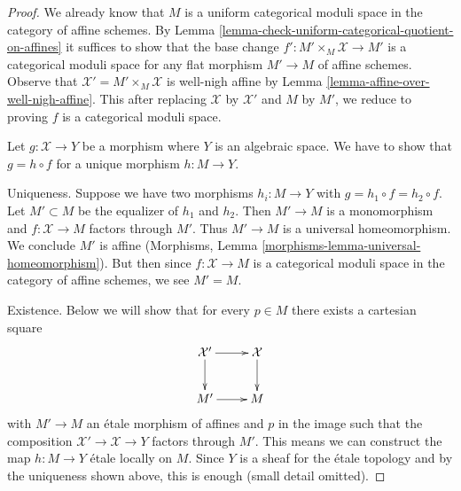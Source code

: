 \documentclass[10pt,a4paper]{amsart}
\theoremstyle{plain}
\theoremstyle{definition}
\theoremstyle{remark}
\numberwithin{equation}{subsection}
\begin{document}
\begin{proof}
We already know that $M$ is a uniform categorical moduli space
in the category of affine schemes. By
Lemma \ref{lemma-check-uniform-categorical-quotient-on-affines}
it suffices to show that the base change
$f' : M' \times_M \mathcal{X} \to M'$
is a categorical moduli space for any flat morphism
$M' \to M$ of affine schemes.
Observe that $\mathcal{X}' = M' \times_M \mathcal{X}$ is well-nigh affine by
Lemma \ref{lemma-affine-over-well-nigh-affine}.
This after replacing $\mathcal{X}$ by $\mathcal{X}'$
and $M$ by $M'$, we reduce to proving $f$ is a categorical
moduli space.

\medskip\noindent
Let $g : \mathcal{X} \to Y$ be a morphism where $Y$ is an algebraic space.
We have to show that $g = h \circ f$ for a unique morphism $h : M \to Y$.

\medskip\noindent
Uniqueness. Suppose we have two morphisms $h_i : M \to Y$ with
$g = h_1 \circ f = h_2 \circ f$. Let $M' \subset M$ be the equalizer
of $h_1$ and $h_2$. Then $M' \to M$ is a monomorphism and
$f : \mathcal{X} \to M$ factors through $M'$. Thus $M' \to M$
is a universal homeomorphism. We conclude $M'$ is affine
(Morphisms, Lemma \ref{morphisms-lemma-universal-homeomorphism}).
But then since $f : \mathcal{X} \to M$
is a categorical moduli space in the category of affine schemes,
we see $M' = M$.

\medskip\noindent
Existence. Below we will show that for every $p \in M$ there exists
a cartesian square
$$
\xymatrix{
\mathcal{X}' \ar[r] \ar[d] & \mathcal{X} \ar[d] \\
M' \ar[r] & M
}
$$
with $M' \to M$ an \'etale morphism of affines and $p$ in the image such that
the composition $\mathcal{X}' \to \mathcal{X} \to Y$ factors through $M'$.
This means we can construct the map $h : M \to Y$ \'etale locally on $M$.
Since $Y$ is a sheaf for the \'etale topology and by the uniqueness shown
above, this is enough (small detail omitted).


\end{proof}
\end{document}

